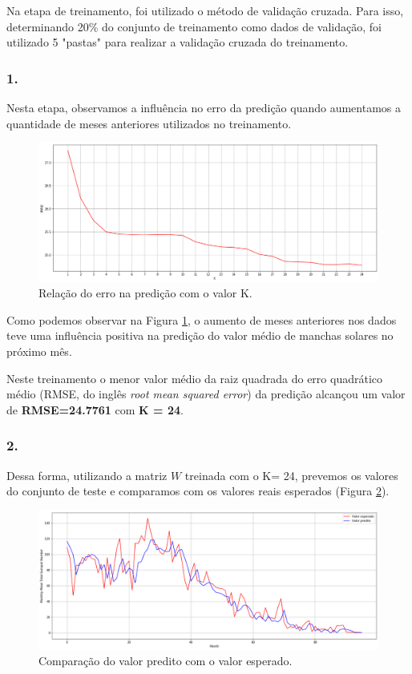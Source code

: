 \documentclass[12pt]{article}
\begin{document}
Na etapa de treinamento, foi utilizado o método de validação cruzada. Para isso, determinando 20\% do conjunto de treinamento como dados de validação, foi utilizado 5 "pastas" para realizar a validação cruzada do treinamento.

\subsubsection*{1.}
Nesta etapa, observamos a influência no erro da predição quando aumentamos a quantidade de meses anteriores utilizados no treinamento.

\begin{figure}[h!]
	\centering
	\includegraphics[width=\linewidth]{rmse_vs_k.png}
	\caption{Relação do erro na predição com o valor K.}
	\label{fig:rmse_vs_k}
\end{figure}

Como podemos observar na Figura \ref{fig:rmse_vs_k}, o aumento de meses anteriores nos dados teve uma influência positiva na predição do valor médio de manchas solares no próximo mês.

Neste treinamento o menor valor médio da raiz quadrada do erro quadrático médio (RMSE, do inglês \textit{root mean squared error}) da predição alcançou um valor de \textbf{RMSE=24.7761}  com  \textbf{K = 24}. 



\pagebreak
\subsubsection*{2.}

Dessa forma, utilizando a matriz $W$ treinada com o K= 24, prevemos os valores do conjunto de teste e comparamos com os valores reais esperados (Figura \ref{fig:test_k_24}).

\begin{figure}[h!]
	\centering
	\includegraphics[width=\linewidth]{test_k_24.png}
	\caption{Comparação do valor predito com o valor esperado.}
	\label{fig:test_k_24}
\end{figure}
\end{document}
